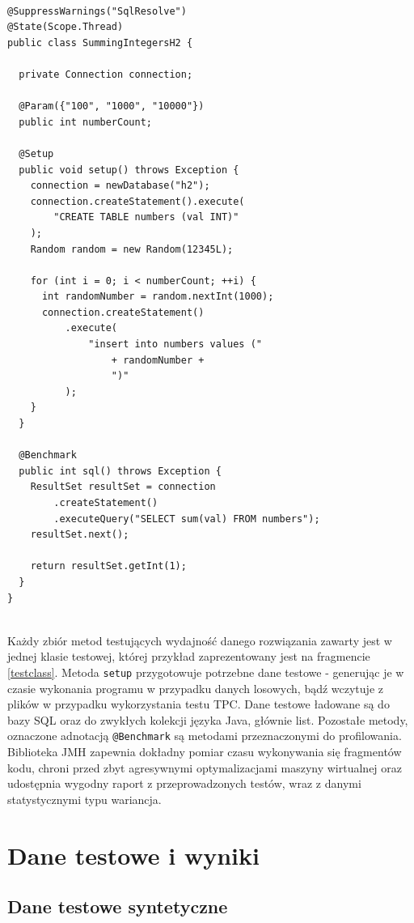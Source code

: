 \documentclass[12pt]{extarticle}
\begin{document}
\begin{lstlisting}[label=testclass, caption=Przykładowa klasa JMH]

@SuppressWarnings("SqlResolve")
@State(Scope.Thread)
public class SummingIntegersH2 {
  
  private Connection connection;
  
  @Param({"100", "1000", "10000"})
  public int numberCount;
  
  @Setup
  public void setup() throws Exception {
    connection = newDatabase("h2");
    connection.createStatement().execute(
        "CREATE TABLE numbers (val INT)"
    );
    Random random = new Random(12345L);
    
    for (int i = 0; i < numberCount; ++i) {
      int randomNumber = random.nextInt(1000);
      connection.createStatement()
          .execute(
              "insert into numbers values ("
                  + randomNumber +
                  ")"
          );
    }
  }
  
  @Benchmark
  public int sql() throws Exception {
    ResultSet resultSet = connection
        .createStatement()
        .executeQuery("SELECT sum(val) FROM numbers");
    resultSet.next();
    
    return resultSet.getInt(1);
  }
}


\end{lstlisting}

    Każdy zbiór metod testujących wydajność danego rozwiązania zawarty jest w jednej klasie testowej, której przykład zaprezentowany jest na fragmencie \ref{testclass}. Metoda \texttt{setup} przygotowuje potrzebne dane testowe - generując je w czasie wykonania programu w przypadku danych losowych, bądź wczytuje z plików w przypadku wykorzystania testu TPC. Dane testowe ładowane są do bazy SQL oraz do zwykłych kolekcji języka Java, głównie list. Pozostałe metody, oznaczone adnotacją \texttt{@Benchmark} są metodami przeznaczonymi do profilowania. Biblioteka JMH zapewnia dokładny pomiar czasu wykonywania się fragmentów kodu, chroni przed zbyt agresywnymi optymalizacjami maszyny wirtualnej oraz udostępnia wygodny raport z przeprowadzonych testów, wraz z danymi statystycznymi typu wariancja.

\section{Dane testowe i wyniki}

\subsection{Dane testowe syntetyczne}
\end{document}

